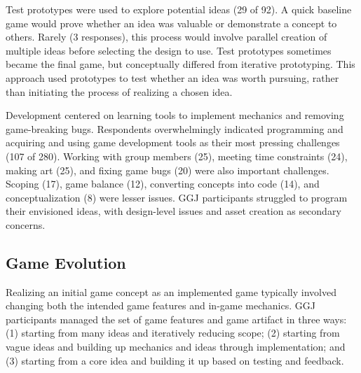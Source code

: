 \documentclass{sig-alternate}
\begin{document}
Test prototypes were used to explore potential ideas (29 of 92).
A quick baseline game would prove whether an idea was valuable or demonstrate a concept to others. Rarely (3 responses), this process would involve parallel creation of multiple ideas before selecting the design to use. 
Test prototypes sometimes became the final game, but conceptually differed from iterative prototyping. This approach used prototypes to test whether an idea was worth pursuing, rather than initiating the process of realizing a chosen idea.

Development centered on learning tools to implement mechanics and removing game-breaking bugs. 
Respondents overwhelmingly indicated programming and acquiring and using game development tools as their most pressing challenges (107 of 280). 
Working with group members (25), meeting time constraints (24), making art (25), and fixing game bugs (20) were also important challenges. 
Scoping (17), game balance (12), converting concepts into code (14), and conceptualization (8) were lesser issues.
GGJ participants struggled to program their envisioned ideas, with design-level issues and asset creation as secondary concerns.




\subsection{Game Evolution}
Realizing an initial game concept as an implemented game typically involved changing both the intended game features and in-game mechanics. 
GGJ participants managed the set of game features and game artifact in three ways:
(1) starting from many ideas and iteratively reducing scope;
(2) starting from vague ideas and building up mechanics and ideas through implementation;
and
(3) starting from a core idea and building it up based on testing and feedback.
\end{document}
